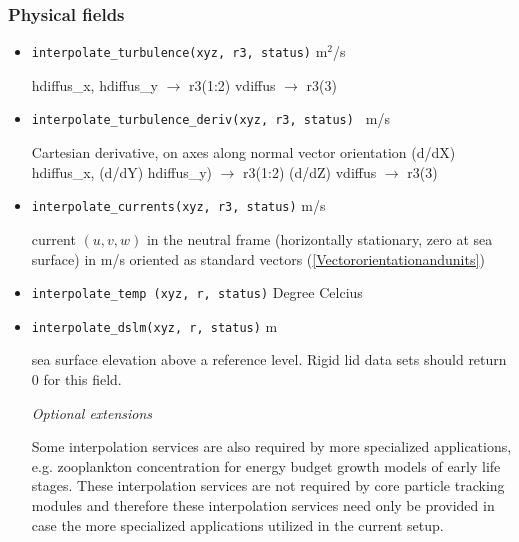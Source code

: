 \subsubsection{Physical fields}

\begin{itemize}
  \item {\tt interpolate\_turbulence(xyz, r3, status)}  m$^2$/s  \newline 
              
        hdiffus\_x, hdiffus\_y $\rightarrow$ r3(1:2)  \newline
        vdiffus                $\rightarrow$ r3(3)  \newline
         
  \item {\tt interpolate\_turbulence\_deriv(xyz, r3, status) } m/s      \newline

        Cartesian derivative, on axes along normal vector orientation \newline
        (d/dX) hdiffus\_x, (d/dY) hdiffus\_y) $\rightarrow$ r3(1:2)  \newline
        (d/dZ) vdiffus          $\rightarrow$ r3(3)  \newline
  
  \item {\tt interpolate\_currents(xyz, r3, status)} m/s \newline
                   
    current $(u,v,w)$ in the neutral frame (horizontally stationary, zero at sea surface)
    in m/s oriented as standard vectors (\ref{Vectororientationandunits}) 
           
  \item {\tt interpolate\_temp (xyz, r, status)} Degree Celcius   \newline       

  \item {\tt interpolate\_dslm(xyz, r, status)}  m                \newline

    sea surface elevation above a reference level. Rigid lid
    data sets should return 0 for this field. 
      
  {\em Optional extensions} \newline

    Some interpolation services are also required by more specialized applications,
    e.g. zooplankton concentration for energy budget growth models of early 
    life stages. These interpolation services are not required by core particle tracking
    modules and therefore these interpolation services need only be provided in
    case the more specialized applications utilized in the current setup.


\end{itemize}
